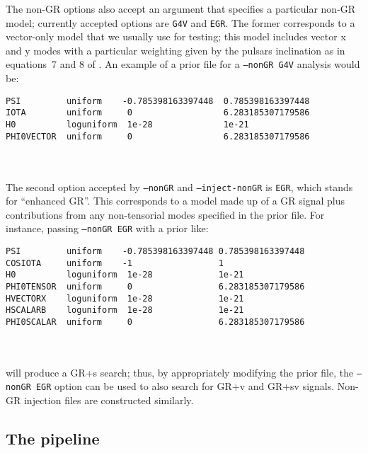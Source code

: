 The non-GR options also accept an argument that specifies a particular non-GR model; currently accepted options are {\tt G4V} and {\tt EGR}. The former corresponds
to a vector-only model \citep[proposed in][]{2015arXiv150304866M} that we usually use for testing; this model includes vector x and y modes with a particular
weighting given by the pulsars inclination as in equations~7 and 8 of \citet{2015PhRvD..91h2002I}. An example of a prior file for a {\tt --nonGR G4V} analysis
would be:
\begin{lrbox}{\Lst}
\begin{lstlisting}
PSI         uniform    -0.785398163397448  0.785398163397448
IOTA        uniform     0                  6.283185307179586
H0          loguniform  1e-28              1e-21
PHI0VECTOR  uniform     0                  6.283185307179586
\end{lstlisting}
\end{lrbox}
\\[5pt] \indent \fbox{\usebox{\Lst}} \\[5pt]
The second option accepted by {\tt --nonGR} and {\tt --inject-nonGR} is {\tt EGR}, which stands for ``enhanced GR''. This corresponds to a model made up of a GR signal
plus contributions from any non-tensorial modes specified in the prior file. For instance, passing {\tt --nonGR EGR} with a prior like:
\begin{lrbox}{\Lst}
\begin{lstlisting}
PSI         uniform    -0.785398163397448 0.785398163397448
COSIOTA     uniform    -1                 1
H0          loguniform  1e-28             1e-21
PHI0TENSOR  uniform     0                 6.283185307179586
HVECTORX    loguniform  1e-28             1e-21
HSCALARB    loguniform  1e-28             1e-21
PHI0SCALAR  uniform     0                 6.283185307179586
\end{lstlisting}
\end{lrbox}
\\[5pt] \indent \fbox{\usebox{\Lst}} \\[5pt]
will produce a GR+s search; thus, by appropriately modifying the prior file, the {\tt --nonGR EGR} option can be used to also search for GR+v and GR+sv signals.
Non-GR injection files are constructed similarly. 

\subsection{The pipeline}

